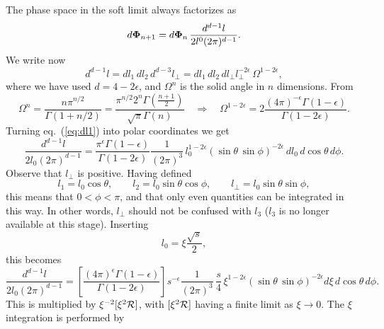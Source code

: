 \documentclass[paper]{JHEP3}
\newcommand\matR{{\cal R}}
\newcommand\Kinnpo{{\bf \Phi}_{n+1}}
\newcommand\Kinn{{\bf \Phi}_n}
\begin{document}
The phase space in the soft limit always factorizes as
\begin{equation}
  d \Kinnpo = d \Kinn\, \frac{d^{d - 1} l}{2 l^0 (2 \pi)^{d - 1}} .
\end{equation}
We write now
\begin{equation}
  d^{d - 1} l = d l_1 \, d l_2 \, d^{d - 3} l_{\perp} = d l_1\, d l_2\, d
  l_{\perp} l_{\perp}^{- 2 \epsilon} \, \Omega^{1 - 2 \epsilon}, \label{eq:dl1}
\end{equation}
where we have used $d = 4 - 2 \epsilon$, and $\Omega^n$ is the solid angle in
$n$ dimensions. From
\begin{equation}
  \Omega^n = \frac{n \pi^{n / 2}}{\Gamma (1 + n / 2)} = \frac{\pi^{n / 2} 2^n
  \Gamma \left( \frac{n + 1}{2} \right)}{\sqrt{\pi} \Gamma (n)}
 \quad \Longrightarrow \quad \Omega^{1 - 2 \epsilon} = 2 \frac{(4 \pi)^{-
  \epsilon} 
  \Gamma \left( 1 - \epsilon \right)}{\Gamma (1 - 2 \epsilon)} .
\end{equation}
Turning eq.~(\ref{eq:dl1}) into polar coordinates we get
\begin{equation}
  \frac{d^{d - 1} l}{2 l_0 (2 \pi)^{d - 1}} = \frac{\pi^{\epsilon} \Gamma
  \left( 1 - \epsilon \right)}{\Gamma (1 - 2 \epsilon)}  \frac{1}{(2 \pi)^3}
  \,l_0^{1 - 2 \epsilon} (\sin \theta \,\sin \phi)^{- 2 \epsilon} \,d l_0\, d
  \cos \theta \,d \phi. 
\end{equation}
Observe that $l_{\perp}$ is positive. Having defined
\begin{equation}
  l_1 = l_0\cos \theta, \qquad l_2 = l_0\sin \theta \cos \phi,\qquad
  l_{\perp} = l_0 \sin \theta \sin  \phi,
\end{equation}
this means that $0 < \phi < \pi$, and that only even quantities can be
integrated in this way. In other words, $l_{\perp}$ should not be confused
with $l_3$ ($l_3$ is no longer available at this stage). Inserting
\begin{equation}
  l_0 = \xi \frac{\sqrt{s}}{2},
\end{equation}
this becomes
\begin{equation}
  \frac{d^{d - 1} l}{2 l_0 (2 \pi)^{d - 1}} = \left[ \frac{(4
  \pi)^{\epsilon} \Gamma \left( 1 - \epsilon \right)}{\Gamma (1 - 2 \epsilon)}
  \right] s^{- \epsilon}  \frac{1}{(2 \pi)^3}  \, \frac{s}{4}\,
 \xi^{1 - 2 \epsilon} (\sin \theta \, \sin
  \phi)^{- 2 \epsilon} d \xi \, d \cos \theta\, d \phi .
\end{equation}
This is multiplied by $\xi^{- 2} [\xi^2 \matR]$, with $[\xi^2 \matR]$ having a
finite limit as $\xi \rightarrow 0$. The $\xi$ integration is performed by
\end{document}
